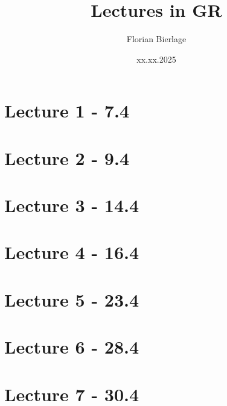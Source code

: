 \documentclass[]{scrbook}
\title{Lectures in GR}
\author{Florian Bierlage}
\date{xx.xx.2025}
\begin{document}
\maketitle
\newpage
\tableofcontents
\newpage

\section*{Lecture 1 - 7.4}


\section*{Lecture 2 - 9.4}


\section*{Lecture 3 - 14.4}


\section*{Lecture 4 - 16.4}


\section*{Lecture 5 - 23.4}


\section*{Lecture 6 - 28.4}


\section*{Lecture 7 - 30.4}

\end{document}
